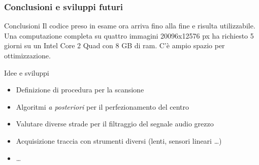 \begin{frame}
\frametitle{Conclusioni e sviluppi futuri}
\begin{block}{Conclusioni}
Il codice preso in esame ora arriva fino alla fine e risulta utilizzabile.
Una computazione completa su quattro immagini 20096x12576 px ha richiesto 5 giorni su 
un Intel Core 2 Quad con 8 GB di ram. C'\`e ampio spazio per ottimizzazione.
\end{block}

\begin{block}{Idee e sviluppi}
\begin{itemize}
\item Definizione di procedura per la scansione
\item Algoritmi \emph{a posteriori} per il perfezionamento del centro
\item Valutare diverse strade per il filtraggio del segnale audio grezzo
\item Acquisizione traccia con strumenti diversi (lenti, sensori lineari \dots)
\item \dots
\end{itemize}
\end{block}

\end{frame}
